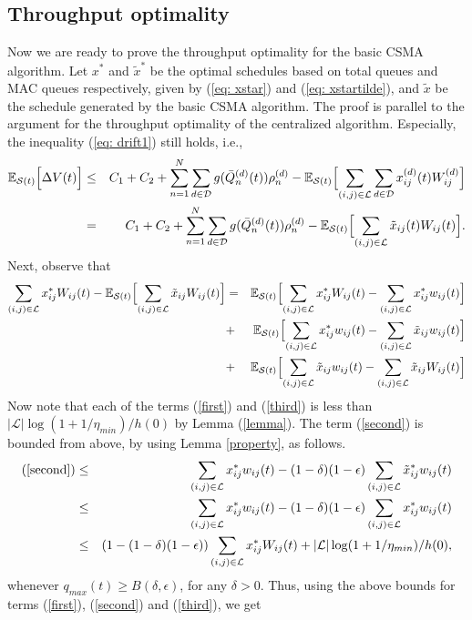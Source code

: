 \documentclass[10pt,onecolumn,draftclsnofoot,journal]{IEEEtran}
\newcommand{\mD} {\mathcal{D}}
\newcommand{\be}{\begin{eqnarray}}
\newcommand{\ee}{\end{eqnarray}}
\newcommand{\ben}{\begin{eqnarray*}}
\newcommand{\een}{\end{eqnarray*}}
\newcommand{\expectS}[1]{{\mathbb E_{\mathcal{S}(t)}} \Bigl[ #1\Bigr]}
\begin{document}
\subsection*{Throughput optimality}
Now we are ready to prove the throughput optimality for the basic CSMA algorithm. Let $x^*$ and $\tilde{x}^*$ be the optimal schedules based on total queues and MAC queues respectively, given by (\ref{eq: xstar}) and (\ref{eq: xstartilde}), and $\tilde{x}$ be the schedule generated by the basic CSMA algorithm. The proof is parallel to the argument for the throughput optimality of the centralized algorithm. Especially, the inequality (\ref{eq: drift1}) still holds, i.e.,
\be \label{drift1}
\expectS{\Delta V(t)} & \leq &  C_1+C_2+\sum_{n=1}^N\sum_{d \in \mD}g(\bar{Q}_n^{(d)}(t))\rho_n^{(d)} -  \expectS{\sum_{(i,j) \in \mathcal{L}}\sum_{d \in \mD} {x}_{ij}^{(d)}(t)W_{ij}^{(d)}} \nonumber\\
& = &  C_1+C_2+\sum_{n=1}^N\sum_{d \in \mD}g(\bar{Q}_n^{(d)}(t))\rho_n^{(d)} -  \expectS{\sum_{(i,j) \in \mathcal{L}}{\tilde{x}}_{ij}(t)W_{ij}(t)}.
\ee
Next, observe that
\be
\sum_{(i,j) \in \mathcal{L}}x^*_{ij}W_{ij}(t)-\expectS{\sum _{(i,j) \in \mathcal{L}}\tilde{x}_{ij}W_{ij}(t)}&=& \expectS{\sum _{(i,j) \in \mathcal{L}}x^*_{ij}W_{ij}(t)-\sum_{(i,j) \in \mathcal{L}}{x}^*_{ij}w_{ij}(t)} \label{first}\\
&+&  \expectS{\sum_{(i,j) \in \mathcal{L}}x^*_{ij}w_{ij}(t)-\sum _{(i,j) \in \mathcal{L}}\tilde{x}_{ij}w_{ij}(t)} \label{second}\\
&+& \expectS{\sum _{(i,j) \in \mathcal{L}}\tilde{x}_{ij}w_{ij}(t) -\sum _{(i,j) \in \mathcal{L}}\tilde{x}_{ij}W_{ij}(t)} \label{third}
\ee
Now note that each of the terms (\ref{first}) and (\ref{third}) is less than $|\mathcal{L}|\log(1+1/\eta_{min})/h(0)$ by Lemma (\ref{lemma}). The term (\ref{second}) is bounded from above, by using Lemma \ref{property}, as follows.
\ben \label{forth}
\mbox{(\ref{second})} & \leq &   \sum_{(i,j) \in \mathcal{L}}x^*_{ij}w_{ij}(t) -(1-\delta)(1-\epsilon)\sum_{(i,j) \in \mathcal{L}}\tilde{x}^*_{ij}w_{ij}(t) \nonumber \\
& \leq &\sum_{(i,j) \in \mathcal{L}}x^*_{ij}w_{ij}(t) -(1-\delta)(1-\epsilon)\sum_{(i,j) \in \mathcal{L}}{x}^*_{ij}w_{ij}(t) \nonumber \\
& \leq &(1-(1-\delta)(1-\epsilon)) \sum_{(i,j) \in \mathcal{L}} {x}^*_{ij}W_{ij}(t) + |\mathcal{L}| \log(1+1/\eta_{min})/h(0),
\een
whenever $q_{max}(t) \geq B(\delta, \epsilon)$, for any $\delta >0$.
Thus, using the above bounds for terms (\ref{first}), (\ref{second}) and (\ref{third}), we get
\end{document}
